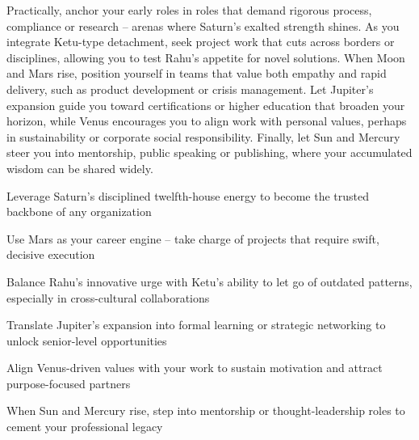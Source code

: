 {\fontsize{9}{13}\selectfont Practically, anchor your early roles in roles that demand rigorous process, compliance or research -- arenas where Saturn's exalted strength shines. As you integrate Ketu-type detachment, seek project work that cuts across borders or disciplines, allowing you to test Rahu's appetite for novel solutions. When Moon and Mars rise, position yourself in teams that value both empathy and rapid delivery, such as product development or crisis management. Let Jupiter's expansion guide you toward certifications or higher education that broaden your horizon, while Venus encourages you to align work with personal values, perhaps in sustainability or corporate social responsibility. Finally, let Sun and Mercury steer you into mentorship, public speaking or publishing, where your accumulated wisdom can be shared widely.}\par\vspace{1.8mm}

\begin{diamondlist}
  \item {\fontsize{8.5}{12}\selectfont Leverage Saturn's disciplined twelfth-house energy to become the trusted backbone of any organization}
  \item {\fontsize{8.5}{12}\selectfont Use Mars as your career engine -- take charge of projects that require swift, decisive execution}
  \item {\fontsize{8.5}{12}\selectfont Balance Rahu's innovative urge with Ketu's ability to let go of outdated patterns, especially in cross-cultural collaborations}
  \item {\fontsize{8.5}{12}\selectfont Translate Jupiter's expansion into formal learning or strategic networking to unlock senior-level opportunities}
  \item {\fontsize{8.5}{12}\selectfont Align Venus-driven values with your work to sustain motivation and attract purpose-focused partners}
  \item {\fontsize{8.5}{12}\selectfont When Sun and Mercury rise, step into mentorship or thought-leadership roles to cement your professional legacy}
\end{diamondlist}


\label{topic33}

